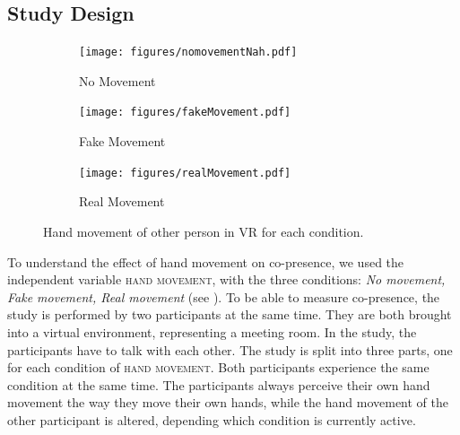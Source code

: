 \documentclass[english,runningheads,a4paper]{llncs}[2018/03/10]
\begin{document}
\subsection{Study Design}
\begin{figure}
    \centering
    \begin{subfigure}{.3\textwidth}
        \texttt{[image: figures/nomovementNah.pdf]}
        \caption{No Movement}
    \end{subfigure} \hfill
    \begin{subfigure}{.3\textwidth}
        \texttt{[image: figures/fakeMovement.pdf]}
        \caption{Fake Movement}
    \end{subfigure} \hfill
    \begin{subfigure}{.3\textwidth}
        \texttt{[image: figures/realMovement.pdf]}
        \caption{Real Movement}
    \end{subfigure}
    \caption{Hand movement of other person in VR for each condition.}
    \label{fig:cond}
\end{figure}
To understand the effect of hand movement on co-presence, we used the independent variable \textsc{hand movement}, with the three conditions: \textit{No movement, Fake movement, Real movement} (see ).
To be able to measure co-presence, the study is performed by two participants at the same time.
They are both brought into a virtual environment, representing a meeting room. 
In the study, the participants have to talk with each other.
The study is split into three parts, one for each condition of \textsc{hand movement}.
Both participants experience the same condition at the same time. 
The participants always perceive their own hand movement the way they move their own hands, while the hand movement of the other participant is altered, depending which condition is currently active. 
\end{document}
